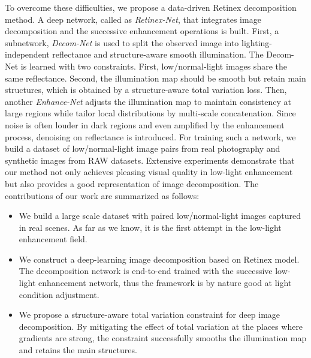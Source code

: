 \documentclass{bmvc2k}
\begin{document}
To overcome these difficulties, we propose a data-driven Retinex decomposition method. A deep network, called as \emph{Retinex-Net}, that integrates image decomposition and the successive enhancement operations is built. First, a subnetwork, \emph{Decom-Net} is used to split the observed image into lighting-independent reflectance and structure-aware smooth illumination. The Decom-Net is learned with two constraints. First, low/normal-light images share the same reflectance. Second, the illumination map should be smooth but retain main structures, which is obtained by a structure-aware total variation loss. Then, another \emph{Enhance-Net} adjusts the illumination map to maintain consistency at large regions while tailor local distributions by multi-scale concatenation. Since noise is often louder in dark regions and even amplified by the enhancement process, denoising on reflectance is introduced. For training such a network, we build a dataset of low/normal-light image pairs from real photography and synthetic images from RAW datasets. Extensive
experiments demonstrate that our method not only achieves pleasing visual quality in low-light enhancement but also provides a good representation of image decomposition. The contributions of our work are summarized as
follows:

\begin{itemize}
\item We build a large scale dataset with paired low/normal-light images captured in real scenes. As far as we know, it is the first attempt in the low-light enhancement field.
\item We construct a deep-learning image decomposition based on Retinex model. The decomposition network is end-to-end trained with the successive low-light enhancement network, thus the framework is by nature good at light condition adjustment.
\item We propose a structure-aware total variation constraint for deep image decomposition. By mitigating the effect of total variation at the places where gradients are strong, the constraint successfully smooths the illumination map and retains the main structures.
\end{itemize}
\end{document}
